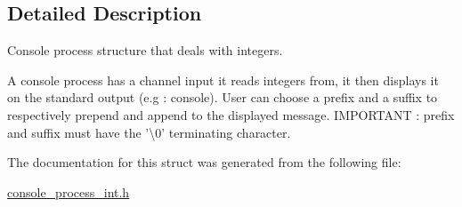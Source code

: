 \subsection{Detailed Description}
Console process structure that deals with integers. 

A console process has a channel input it reads integers from, it then displays it on the standard output (e.\-g \-: console). User can choose a prefix and a suffix to respectively prepend and append to the displayed message. I\-M\-P\-O\-R\-T\-A\-N\-T \-: prefix and suffix must have the '\textbackslash{}0' terminating character. 

The documentation for this struct was generated from the following file\-:\begin{DoxyCompactItemize}
\item 
\hyperlink{console__process__int_8h}{console\-\_\-process\-\_\-int.\-h}\end{DoxyCompactItemize}
